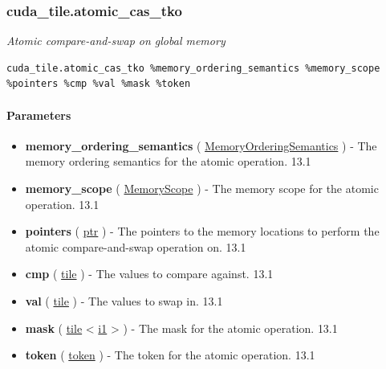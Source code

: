 \documentclass{article}
\begin{document}
\subsubsection{cuda\_tile.atomic\_cas\_tko}

\textit{Atomic compare-and-swap on global memory}


\begin{lstlisting}
cuda_tile.atomic_cas_tko %memory_ordering_semantics %memory_scope %pointers %cmp %val %mask %token
\end{lstlisting}

\paragraph{Parameters}

\begin{itemize}
\item \textbf{memory\_ordering\_semantics} ( \href{https://docs.nvidia.com/cuda/tile-ir/latest/sections/operations.html#op-attribute-cuda-tile-atomic-cas-tko-memoryorderingsemantics-attr}{MemoryOrderingSemantics} ) - The memory ordering semantics for the atomic operation. 13.1
\item \textbf{memory\_scope} ( \href{https://docs.nvidia.com/cuda/tile-ir/latest/sections/operations.html#op-attribute-cuda-tile-atomic-cas-tko-memoryscope-attr}{MemoryScope} ) - The memory scope for the atomic operation. 13.1
\item \textbf{pointers} ( \href{https://docs.nvidia.com/cuda/tile-ir/latest/sections/types.html#type-ptr}{ptr} ) - The pointers to the memory locations to perform the atomic compare-and-swap operation on. 13.1
\item \textbf{cmp} ( \href{https://docs.nvidia.com/cuda/tile-ir/latest/sections/types.html#type-tile}{tile} ) - The values to compare against. 13.1
\item \textbf{val} ( \href{https://docs.nvidia.com/cuda/tile-ir/latest/sections/types.html#type-tile}{tile} ) - The values to swap in. 13.1
\item \textbf{mask} ( \href{https://docs.nvidia.com/cuda/tile-ir/latest/sections/types.html#type-tile}{tile} < \href{https://docs.nvidia.com/cuda/tile-ir/latest/sections/types.html#subsection-element-types}{i1} > ) - The mask for the atomic operation. 13.1
\item \textbf{token} ( \href{https://docs.nvidia.com/cuda/tile-ir/latest/sections/operations.html#type-token}{token} ) - The token for the atomic operation. 13.1



\end{itemize}
\end{document}
